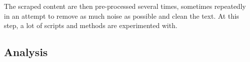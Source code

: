 The scraped content are then pre-processed several times, sometimes repeatedly in an attempt to remove as much noise as possible and clean the text. At this step, a lot of scripts and methods are experimented with.

\begin{comment}
    Explain further on preprocessing scraped text.
\end{comment}


\subsection{Analysis}


\begin{comment}
Additionally, BAT includes 175,807 comments and retweets referring to the articles.

The existing literature suggests that labels provided by Ad Fontes media are suitable for media bias-related tasks and are of high quality [43]. However, especially since it relies on manual labels, the Ad Fontes article set does not cover the full range of political and non-political, recent and less recent, or controversial and non-controversial topics. The article selection by Ad Fontes media thus likely introduces bias into the dataset.

Ad Fontes: Bentley et al. (2019) (Understanding Online News Behaviors) show that the portals’ labels are highly correlated to findings from social scientists.

\end{comment}




